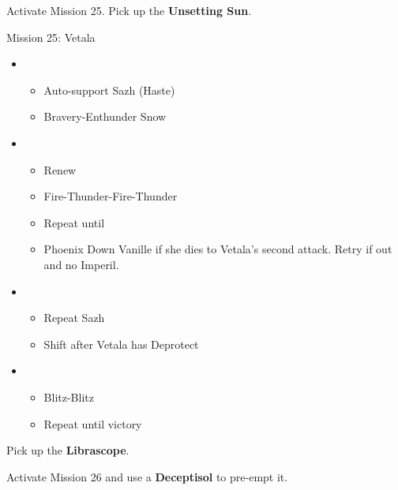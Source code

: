 Activate Mission 25.
Pick up the \textbf{Unsetting Sun}.

	\begin{battle}[0:38]{Mission 25: Vetala}
		\begin{itemize}
			\item \third
			      \begin{itemize}
				      \item Auto-support Sazh (Haste)
				      \item Bravery-Enthunder Snow
			      \end{itemize}
			\item \fifth
			      \begin{itemize}
				      \item Renew
				      \item Fire-Thunder-Fire-Thunder
				      \item Repeat until \stagger
				      \item Phoenix Down Vanille if she dies to Vetala's second attack. Retry if out and no Imperil.
			      \end{itemize}
			      \columnbreak
			\item \third
			      \begin{itemize}
				      \item Repeat Sazh
				      \item Shift after Vetala has Deprotect
			      \end{itemize}
			\item \sixth
			      \begin{itemize}
				      \item Blitz-Blitz
				      \item Repeat until victory
			      \end{itemize}
		\end{itemize}
	\end{battle}

Pick up the \textbf{Librascope}.

Activate Mission 26 and use a \textbf{Deceptisol} to pre-empt it.

